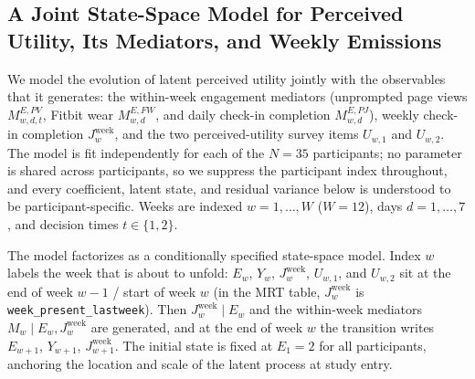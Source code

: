 \subsection{A Joint State-Space Model for Perceived Utility, Its Mediators, and Weekly Emissions}
\label{sec:joint_model}

We model the evolution of latent perceived utility jointly with the observables
that it generates: the within-week engagement mediators (unprompted page views
$M_{w,d,t}^{E,PV}$, Fitbit wear $M_{w,d}^{E,FW}$, and daily check-in completion
$M_{w,d}^{E,PJ}$), weekly check-in completion $J_w^{\mathrm{week}}$, and the two
perceived-utility survey items $U_{w,1}$ and $U_{w,2}$. The model is fit
independently for each of the $N = 35$ participants; no parameter is shared
across participants, so we suppress the participant index throughout, and every
coefficient, latent state, and residual variance below is understood to be
participant-specific. Weeks are indexed $w = 1, \ldots, W$ ($W = 12$), days
$d = 1, \ldots, 7$, and decision times $t \in \{1, 2\}$.

The model factorizes as a conditionally specified state-space model.
Index $w$ labels the week that is about to unfold: $E_w$, $Y_w$,
$J_w^{\mathrm{week}}$, $U_{w,1}$, and $U_{w,2}$ sit at the end of week
$w-1$ / start of week $w$ (in the MRT table, $J_w^{\mathrm{week}}$ is
\texttt{week_present_lastweek}). Then $J_w^{\mathrm{week}} \mid E_w$ and
the within-week mediators $M_w \mid E_w, J_w^{\mathrm{week}}$ are generated,
and at the end of week $w$ the transition writes $E_{w+1}$, $Y_{w+1}$,
$J_{w+1}^{\mathrm{week}}$. The initial state is fixed at $E_1 = 2$ for all
participants, anchoring the location and scale of the latent process at study
entry.

